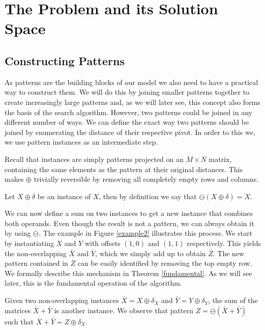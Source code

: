 \documentclass[a4paper,notoc,oneside]{tufte-book}
\begin{document}
\section{The Problem and its Solution Space}

\subsection{Constructing Patterns}

As patterns are the building blocks of our model we also need to have a practical way to construct them. We will do this by joining smaller patterns together to create increasingly large patterns and, as we will later see, this concept also forms the basis of the search algorithm. However, two patterns could be joined in any different number of ways. We can define the exact way two patterns should be joined by enumerating the distance of their respective pivot. In order to this we, we use pattern instances as an intermediate step.

Recall that instances are simply patterns projected on an $M\times N$ matrix, containing the same elements as the pattern at their original distances. This makes $\oplus$ trivially reversible by removing all completely empty rows and columns.

\begin{definition}
Let $X \oplus \delta$ be an instance of $X$, then by definition we say that $\ominus(X \oplus \delta) = X$.
\end{definition}

We can now define a sum on two instances to get a new instance that combines both operands. Even though the result is not a pattern, we can always obtain it by using $\ominus$. The example in Figure \ref{example2} illustrates this process. We start by instantiating $X$ and $Y$ with offsets $(1,0)$ and $(1,1)$ respectively. This yields the non-overlapping $\bar{X}$ and $\bar{Y}$, which we simply add up to obtain $\bar{Z}$. The new pattern contained in $\bar{Z}$ can be easily identified by removing the top empty row. We formally describe this mechanism in Theorem \ref{fundamental}. As we will see later, this is the fundamental operation of the algorithm.

\begin{marginfigure}


\label{example2}
\end{marginfigure}

\begin{theorem}\label{fundamental}
Given two non-overlapping instances $\bar{X}=X\oplus \delta_X$ and $\bar{Y}=Y\oplus \delta_Y$, the sum of the matrices $\bar{X} + \bar{Y}$ is another instance. We observe that pattern $Z=\ominus(\bar{X} + \bar{Y})$ such that $\bar{X} + \bar{Y} = Z\oplus \delta_X$.
\end{theorem}
\end{document}
